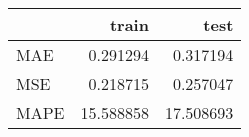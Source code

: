 \begin{tabular}{lrr}
\toprule
{} &      train &       test \\
\midrule
MAE  &   0.291294 &   0.317194 \\
MSE  &   0.218715 &   0.257047 \\
MAPE &  15.588858 &  17.508693 \\
\bottomrule
\end{tabular}
